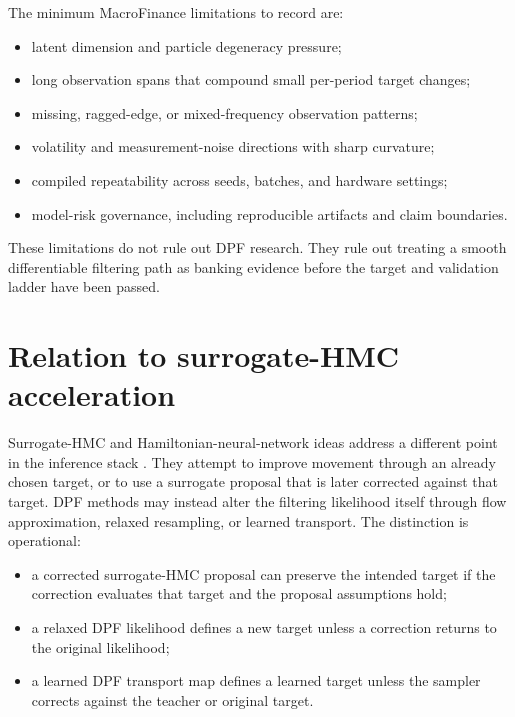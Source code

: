 The minimum MacroFinance limitations to record are:
\begin{itemize}
  \item latent dimension and particle degeneracy pressure;
  \item long observation spans that compound small per-period target changes;
  \item missing, ragged-edge, or mixed-frequency observation patterns;
  \item volatility and measurement-noise directions with sharp curvature;
  \item compiled repeatability across seeds, batches, and hardware settings;
  \item model-risk governance, including reproducible artifacts and claim
    boundaries.
\end{itemize}
These limitations do not rule out DPF research.  They rule out treating a
smooth differentiable filtering path as banking evidence before the target and
validation ladder have been passed.

\section{Relation to surrogate-HMC acceleration}
\label{sec:bf-dpf-hmc-hnn-surrogates}

Surrogate-HMC and Hamiltonian-neural-network ideas address a different point in
the inference stack \citep{greydanus2019hamiltonian,hoffman2019neutra,parno2018transport}.  They attempt to improve
movement through an already chosen target, or to use a surrogate proposal that
is later corrected against that target.  DPF methods may instead alter the
filtering likelihood itself through flow approximation, relaxed resampling, or
learned transport.  The distinction is operational:
\begin{itemize}
  \item a corrected surrogate-HMC proposal can preserve the intended target if
    the correction evaluates that target and the proposal assumptions hold;
  \item a relaxed DPF likelihood defines a new target unless a correction
    returns to the original likelihood;
  \item a learned DPF transport map defines a learned target unless the sampler
    corrects against the teacher or original target.
\end{itemize}

